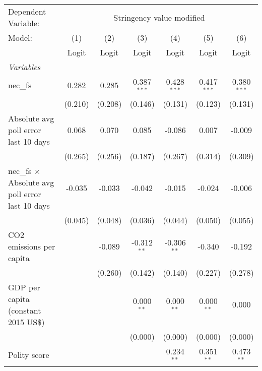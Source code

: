
\begingroup
\centering
\begin{tabular}{lcccccc}
   \toprule
   Dependent Variable: & \multicolumn{6}{c}{Stringency value modified}\\
   Model:                                                  & (1)     & (2)     & (3)           & (4)           & (5)           & (6)\\  
                                                           &  Logit  & Logit   & Logit         & Logit         & Logit         & Logit\\  
   \midrule
   \emph{Variables}\\
   nec\_fs                                                 & 0.282   & 0.285   & 0.387$^{***}$ & 0.428$^{***}$ & 0.417$^{***}$ & 0.380$^{***}$\\   
                                                           & (0.210) & (0.208) & (0.146)       & (0.131)       & (0.123)       & (0.131)\\   
   Absolute avg poll error last 10 days                    & 0.068   & 0.070   & 0.085         & -0.086        & 0.007         & -0.009\\   
                                                           & (0.265) & (0.256) & (0.187)       & (0.267)       & (0.314)       & (0.309)\\   
   nec\_fs $\times$ Absolute avg poll error last 10 days   & -0.035  & -0.033  & -0.042        & -0.015        & -0.024        & -0.006\\   
                                                           & (0.045) & (0.048) & (0.036)       & (0.044)       & (0.050)       & (0.055)\\   
   CO2 emissions per capita                                &         & -0.089  & -0.312$^{**}$ & -0.306$^{**}$ & -0.340        & -0.192\\   
                                                           &         & (0.260) & (0.142)       & (0.140)       & (0.227)       & (0.278)\\   
   GDP per capita (constant 2015 US\$)                     &         &         & 0.000$^{**}$  & 0.000$^{**}$  & 0.000$^{**}$  & 0.000\\   
                                                           &         &         & (0.000)       & (0.000)       & (0.000)       & (0.000)\\   
   Polity score                                            &         &         &               & 0.234$^{**}$  & 0.351$^{**}$  & 0.473$^{**}$\\   

\end{tabular}
